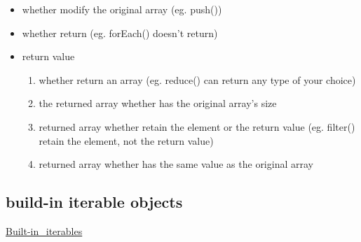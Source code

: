 \documentclass[a4paper, 12pt]{article}
\begin{document}
\begin{itemize}
\item whether modify the original array (eg. push())

\item whether return (eg. forEach() doesn't return)

\item return value
\begin{enumerate}
\item whether return an array (eg. reduce() can return any type of your choice)

\item the returned array whether has the original array's size

\item returned array whether retain the element or the return value (eg. filter() retain the element, not the return value)

\item returned array whether has the same value as the original array
\end{enumerate}

\end{itemize}

\subsection{build-in iterable objects}
\href{https://developer.mozilla.org/en-US/docs/Web/JavaScript/Reference/Iteration_protocols#Built-in_iterables}{Built-in\_iterables}
\end{document}
